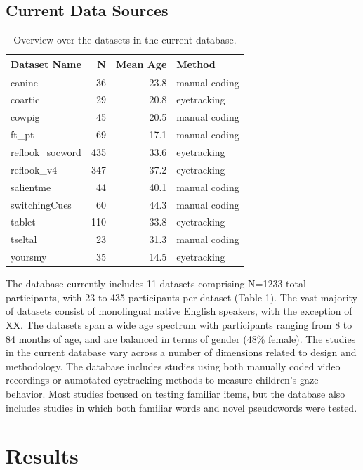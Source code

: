 \documentclass[10pt, letterpaper]{article}
\begin{document}
\hypertarget{current-data-sources}{%
\subsection{Current Data Sources}\label{current-data-sources}}

\begin{table}[H]
\centering
\begingroup\fontsize{9pt}{10pt}\selectfont
\begin{tabular}{lrrl}
  \hline
Dataset Name & N & Mean Age & Method \\
  \hline
canine & 36 & 23.8 & manual coding \\
  coartic & 29 & 20.8 & eyetracking \\
  cowpig & 45 & 20.5 & manual coding \\
  ft\_pt & 69 & 17.1 & manual coding \\
  reflook\_socword & 435 & 33.6 & eyetracking \\
  reflook\_v4 & 347 & 37.2 & eyetracking \\
  salientme & 44 & 40.1 & manual coding \\
  switchingCues & 60 & 44.3 & manual coding \\
  tablet & 110 & 33.8 & eyetracking \\
  tseltal & 23 & 31.3 & manual coding \\
  yoursmy & 35 & 14.5 & eyetracking \\
   \hline
\end{tabular}
\endgroup
\caption{Overview over the datasets in the current database.}
\end{table}

The database currently includes 11 datasets comprising N=1233 total
participants, with 23 to 435 participants per dataset (Table 1). The
vast majority of datasets consist of monolingual native English
speakers, with the exception of XX. The datasets span a wide age
spectrum with participants ranging from 8 to 84 months of age, and are
balanced in terms of gender (48\% female). The studies in the current
database vary across a number of dimensions related to design and
methodology. The database includes studies using both manually coded
video recordings or aumotated eyetracking methods to measure children's
gaze behavior. Most studies focused on testing familiar items, but the
database also includes studies in which both familiar words and novel
pseudowords were tested.

\hypertarget{results}{%
\section{Results}\label{results}}
\end{document}
